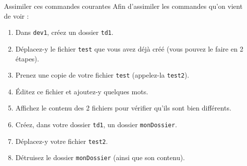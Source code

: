 \documentclass[a4paper,11pt]{style-esi/td}
\begin{document}
		\begin{Exercice}{Assimiler ces commandes courantes}
			Afin d'assimiler les commandes qu'on vient de voir :
			\begin{enumerate}
			\item Dans \texttt{dev1}, créez un dossier \texttt{td1}. 
			\item Déplacez-y le fichier \texttt{test} que vous avez déjà créé
				(vous pouvez le faire en 2 étapes).
			\item Prenez une copie de votre fichier \verb_test_ (appelez-la \verb_test2_).
			\item Éditez ce fichier et ajoutez-y quelques mots.
			\item Affichez le contenu des 2 fichiers pour vérifier qu'ils sont bien différents.
			\item Créez, dans votre dossier \verb_td1_, un dossier \verb_monDossier_.
			\item Déplacez-y votre fichier \verb_test2_.
			\item Détruisez le dossier \verb_monDossier_ (ainsi que son contenu).
			\end{enumerate}
		\end{Exercice}

	


\end{document}
